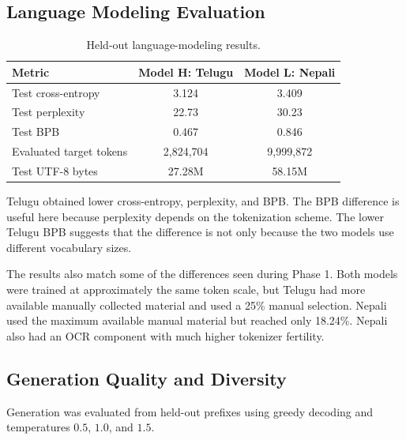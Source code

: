 \documentclass[10pt,a4paper]{article}
\begin{document}
\subsection{Language Modeling Evaluation}

\begin{table}[H]
\centering
\small
\caption{Held-out language-modeling results.}
\begin{tabular}{lcc}
\toprule
Metric & \textbf{Model H: Telugu} & \textbf{Model L: Nepali}\\
\midrule
Test cross-entropy & 3.124 & 3.409\\
Test perplexity & 22.73 & 30.23\\
Test BPB & 0.467 & 0.846\\
Evaluated target tokens & 2,824,704 & 9,999,872\\
Test UTF-8 bytes & 27.28M & 58.15M\\
\bottomrule
\end{tabular}
\end{table}

Telugu obtained lower cross-entropy, perplexity, and BPB.
The BPB difference is useful here because perplexity depends on the
tokenization scheme. The lower Telugu BPB suggests that the
difference is not only because the two models use different
vocabulary sizes.

The results also match some of the differences seen during Phase 1.
Both models were trained at approximately the same token scale, but
Telugu had more available manually collected material and used a
25\% manual selection. Nepali used the maximum available manual
material but reached only 18.24\%. Nepali also had an OCR component
with much higher tokenizer fertility.

\subsection{Generation Quality and Diversity}

Generation was evaluated from held-out prefixes using greedy decoding
and temperatures $0.5$, $1.0$, and $1.5$.
\end{document}
